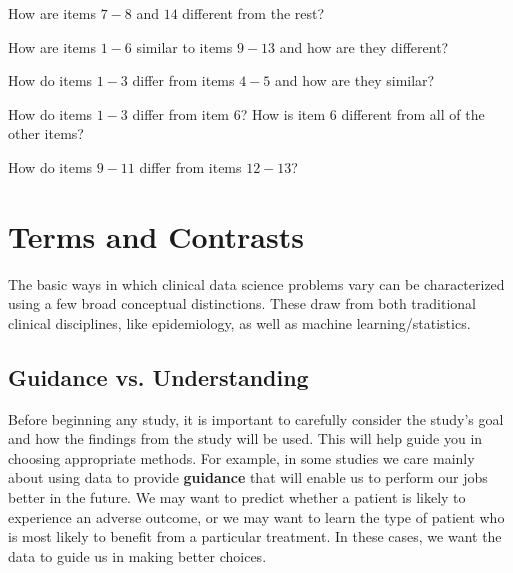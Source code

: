 \begin{question}{}
How are items $7-8$ and $14$ different from the rest? 
\end{question}

\begin{question}{}
How are items $1-6$ similar to items $9-13$ and how are they different? 
\end{question}

\begin{question}{}
How do items $1-3$ differ from items $4-5$ and how are they similar? 
\end{question}

\begin{question}{}
How do items $1-3$ differ from item $6$? How is item $6$ different from all of the other items? 
\end{question}

\begin{question}{}
How do items $9-11$ differ from items $12-13$? 
\end{question}


\section{Terms and Contrasts}

The basic ways in which clinical data science problems vary can be characterized using a few broad conceptual distinctions. These draw from both traditional clinical disciplines, like epidemiology, as well as machine learning/statistics.

\subsection{Guidance vs. Understanding}

Before beginning any study, it is important to carefully consider the study's goal and how the findings from the study will be used. This will help guide you in choosing appropriate methods. For example, in some studies we care mainly about using data to provide \textbf{guidance} that will enable us to perform our jobs better in the future. We may want to predict whether a patient is likely to experience an adverse outcome, or we may want to learn the type of patient who is most likely to benefit from a particular treatment. In these cases, we want the data to guide us in making better choices.

